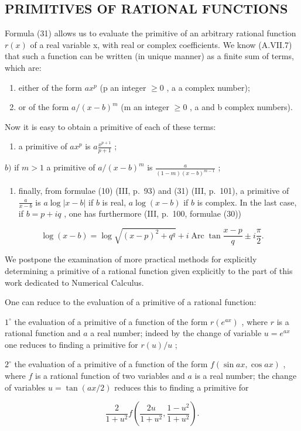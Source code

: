 \subsection{PRIMITIVES OF RATIONAL FUNCTIONS}

Formula (31) allows us to evaluate the primitive of an arbitrary rational function \(r(x)\) of a real variable x, with real or complex coefficients. We know (A.VII.7) that such a function can be written (in unique manner) as a finite sum of terms, which are:

\begin{enumerate}
\def\labelenumi{\alph{enumi})}
\item
  either of the form \(ax^{p}\) (p an integer \(\geqslant 0\) , a a complex number);
\item
  or of the form \(a/(x - b)^{m}\) (m an integer \(\geqslant 0\) , a and b complex numbers).
\end{enumerate}

Now it is easy to obtain a primitive of each of these terms:

\begin{enumerate}
\def\labelenumi{\alph{enumi})}
\tightlist
\item
  a primitive of \(ax^p\) is \(a\frac{x^{p + 1}}{p + 1}\) ;
\end{enumerate}

\(b)\) if \(m > 1\) a primitive of \(a / (x - b)^{m}\) is \(\frac{a}{(1 - m)(x - b)^{m - 1}}\) ;

\begin{enumerate}
\def\labelenumi{\alph{enumi})}
\setcounter{enumi}{2}
\tightlist
\item
  finally, from formulae (10) (III, p.~93) and (31) (III, p.~101), a primitive of \(\frac{a}{x - b}\) is \(a\log |x - b|\) if \(b\) is real, \(a\log (x - b)\) if \(b\) is complex. In the last case, if \(b = p + iq\) , one has furthermore (III, p.~100, formulae (30))
\end{enumerate}

\[
\log (x - b) = \log \sqrt {(x - p) ^ {2} + q ^ {q}} + i \operatorname{Arc} \tan \frac {x - p}{q} \pm i \frac {\pi}{2}.
\]

We postpone the examination of more practical methods for explicitly determining a primitive of a rational function given explicitly to the part of this work dedicated to Numerical Calculus.

One can reduce to the evaluation of a primitive of a rational function:

\(1^{\circ}\) the evaluation of a primitive of a function of the form \(r(e^{ax})\) , where \(r\) is a rational function and \(a\) a real number; indeed by the change of variable \(u = e^{ax}\) one reduces to finding a primitive for \(r(u) / u\) ;

\(2^{\circ}\) the evaluation of a primitive of a function of the form \(f(\sin ax, \cos ax)\) , where \(f\) is a rational function of two variables and \(a\) is a real number; the change of variables \(u = \tan(ax/2)\) reduces this to finding a primitive for

\[
{\frac {2}{1 + u ^ {2}}} f \left({\frac {2 u}{1 + u ^ {2}}}, {\frac {1 - u ^ {2}}{1 + u ^ {2}}}\right).
\]

